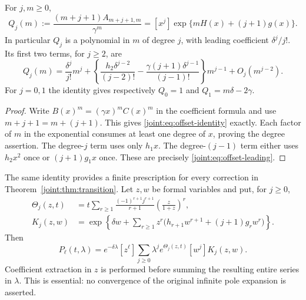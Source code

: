 \begin{proposition}
\label{joint:prop:offset}
For $j,m\geq0$,
\begin{equation}\label{joint:eq:offset-identity}
 Q_j(m):=\frac{(m+j+1)A_{m+j+1,m}}{\gamma^m}
       =[x^j]\exp\{mH(x)+(j+1)g(x)\}.
\end{equation}
In particular $Q_j$ is a polynomial in $m$ of degree $j$, with
leading coefficient $\delta^j/j!$. Its first two terms, for $j\geq2$,
are
\begin{equation}\label{joint:eq:offset-leading}
 Q_j(m)=\frac{\delta^j}{j!}m^j
 +\left\{\frac{h_2\delta^{j-2}}{(j-2)!}
       -\frac{\gamma(j+1)\delta^{j-1}}{(j-1)!}\right\}m^{j-1}
 +O_j(m^{j-2}).
\end{equation}
For $j=0,1$ the identity gives respectively
$Q_0=1$ and $Q_1=m\delta-2\gamma$.
\end{proposition}
\begin{proof}
Write $B(x)^m=(\gamma x)^mC(x)^m$ in the coefficient formula
and use $m+j+1=m+(j+1)$. This gives
\eqref{joint:eq:offset-identity} exactly.
Each factor of $m$ in the exponential consumes at least one degree
of $x$, proving the degree assertion. The degree-$j$ term uses only
$h_1x$. The degree-$(j-1)$ term either uses $h_2x^2$ once or
$(j+1)g_1x$ once. These are precisely
\eqref{joint:eq:offset-leading}.
\end{proof}

The same identity provides a finite prescription for every correction
in Theorem~\ref{joint:thm:transition}. Let $z,w$ be formal variables and
put, for $j\geq0$,
\begin{align*}
 \Theta_j(z,t)
 &=t\sum_{r\geq1}\frac{(-1)^{r+1}j^{r+1}}{r+1}
                                  \left(\frac z{1+z}\right)^r,\\
 K_j(z,w)
 &=\exp\left\{\delta w+
      \sum_{r\geq1}z^r
        \bigl(h_{r+1}w^{r+1}+(j+1)g_rw^r\bigr)\right\}.
\end{align*}
Then
\begin{equation}\label{joint:eq:polynomial-prescription}
 \boxed{\displaystyle
 P_\ell(t,\lambda)=e^{-\delta\lambda}[z^\ell]
   \sum_{j\geq0}\lambda^j e^{\Theta_j(z,t)}[w^j]K_j(z,w).}
\end{equation}
Coefficient extraction in $z$ is performed before summing the
resulting entire series in $\lambda$. This is essential: no convergence
of the original infinite pole expansion is asserted.

